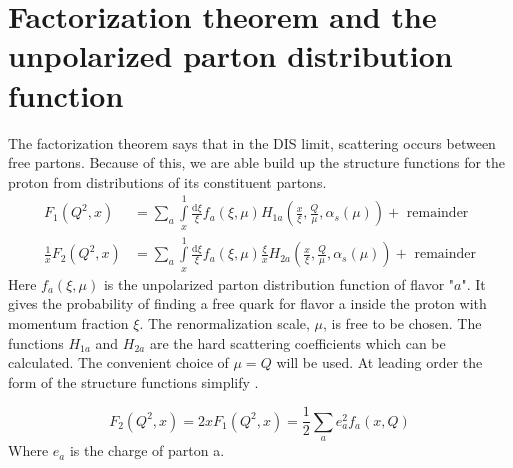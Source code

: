 \documentclass[abstract = on,listof=totoc, bibliography=totoc]{scrreprt}
\begin{document}
\section{Factorization theorem and the unpolarized parton distribution function}

The factorization theorem says that in the DIS limit,  scattering occurs between free partons. Because of this, we are able build up the structure functions for the proton from distributions of its constituent partons. 
\begin{eqnarray}
F_1(Q^2,x) &= \sum\limits_a \int\limits_x^1 \frac{\text{d}\xi}{\xi}f_a(\xi,\mu)H_{1a}\left(\frac{x}{\xi},\frac{Q}{\mu}, \alpha_s(\mu)\right) + \text{ remainder}\\
\frac{1}{x}F_2(Q^2,x) &= \sum\limits_a \int\limits_x^1 \frac{\text{d}\xi}{\xi}f_a(\xi,\mu)\frac{\xi}{x}H_{2a}\left(\frac{x}{\xi},\frac{Q}{\mu}, \alpha_s(\mu)\right) + \text{ remainder}
\end{eqnarray} 
Here $f_a(\xi,\mu)$ is the unpolarized parton distribution function of flavor "$a$". It gives the probability of finding a free quark for flavor a inside the proton with momentum fraction $\xi$. The renormalization scale, $\mu$, is free to be chosen. The functions $H_{1a}$ and $H_{2a}$ are the hard scattering coefficients which can be calculated. The convenient choice of $\mu = Q$ will be used.\cite{factorization} At leading order the form of the structure functions simplify \cite{IEP}.

\begin{equation}
F_2(Q^2,x) = 2x F_1(Q^2,x) = \frac{1}{2}\sum\limits_a e_a ^2 f_a(x, Q)
\end{equation} 
Where $e_a$ is the charge of parton a.
\end{document}
